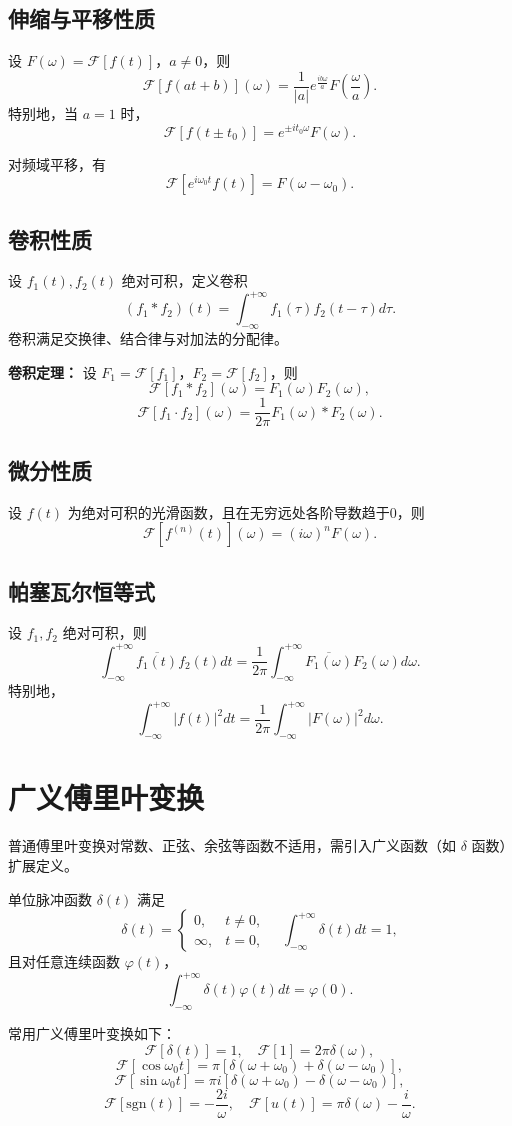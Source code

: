 \subsection{伸缩与平移性质}
设 \( F(\omega)=\mathscr{F}[f(t)] \)，\( a\neq0 \)，则
\[
\mathscr{F}\left[f(at+b)\right](\omega)
=
\frac{1}{|a|} e^{\frac{i b \omega}{a}} F\left(\frac{\omega}{a}\right).
\]
特别地，当 \( a=1 \) 时，
\[
\mathscr{F}\left[f(t\pm t_0)\right]
=
e^{\pm i t_0 \omega} F(\omega).
\]

对频域平移，有
\[
\mathscr{F}\left[e^{i\omega_0 t}f(t)\right]
=
F(\omega-\omega_0).
\]

\subsection{卷积性质}
设 \( f_1(t),f_2(t) \) 绝对可积，定义卷积
\[
(f_1*f_2)(t)
=
\int_{-\infty}^{+\infty}f_1(\tau)f_2(t-\tau)d\tau.
\]
卷积满足交换律、结合律与对加法的分配律。

\textbf{卷积定理：}
设 \( F_1=\mathscr{F}[f_1] \)，\( F_2=\mathscr{F}[f_2] \)，则
\[
\mathscr{F}\left[f_1*f_2\right](\omega)
=
F_1(\omega)F_2(\omega),
\]
\[
\mathscr{F}\left[f_1\cdot f_2\right](\omega)
=
\frac{1}{2\pi}F_1(\omega)*F_2(\omega).
\]

\subsection{微分性质}
设 \( f(t) \) 为绝对可积的光滑函数，且在无穷远处各阶导数趋于0，则
\[
\mathscr{F}\left[f^{(n)}(t)\right](\omega)
=
(i\omega)^n F(\omega).
\]

\subsection{帕塞瓦尔恒等式}
设 \( f_1,f_2 \) 绝对可积，则
\[
\int_{-\infty}^{+\infty}\overline{f_1(t)}f_2(t)dt
=
\frac{1}{2\pi}\int_{-\infty}^{+\infty}\overline{F_1(\omega)}F_2(\omega)d\omega.
\]
特别地，
\[
\int_{-\infty}^{+\infty}|f(t)|^2dt
=
\frac{1}{2\pi}\int_{-\infty}^{+\infty}|F(\omega)|^2d\omega.
\]

\section{广义傅里叶变换}
普通傅里叶变换对常数、正弦、余弦等函数不适用，需引入广义函数（如 \( \delta \) 函数）扩展定义。

单位脉冲函数 \( \delta(t) \) 满足
\[
\delta(t)=
\begin{cases}
0, & t\neq0, \\
\infty, & t=0,
\end{cases}
\quad
\int_{-\infty}^{+\infty}\delta(t)dt=1,
\]
且对任意连续函数 \( \varphi(t) \)，
\[
\int_{-\infty}^{+\infty}\delta(t)\varphi(t)dt=\varphi(0).
\]

常用广义傅里叶变换如下：
\[
\mathscr{F}[\delta(t)]=1,\quad
\mathscr{F}[1]=2\pi\delta(\omega),
\]
\[
\mathscr{F}[\cos\omega_0 t]
=
\pi\left[\delta(\omega+\omega_0)+\delta(\omega-\omega_0)\right],
\]
\[
\mathscr{F}[\sin\omega_0 t]
=
\pi i\left[\delta(\omega+\omega_0)-\delta(\omega-\omega_0)\right],
\]
\[
\mathscr{F}[\text{sgn}(t)]=-\frac{2i}{\omega},\quad
\mathscr{F}[u(t)]=\pi\delta(\omega)-\frac{i}{\omega}.
\]